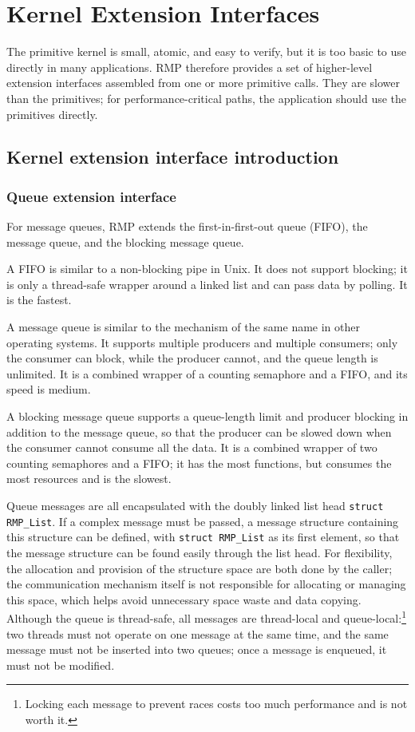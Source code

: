 \chapter{Kernel Extension Interfaces}\label{ch:extensions}

The primitive kernel is small, atomic, and easy to verify, but it is too basic to use directly in many applications.
RMP therefore provides a set of higher-level extension interfaces assembled from one or more primitive calls.
They are slower than the primitives; for performance-critical paths, the application should use the primitives directly.

\section{Kernel extension interface introduction}

\subsection{Queue extension interface}

For message queues, RMP extends the first-in-first-out queue (FIFO), the message queue, and the blocking message queue.

A FIFO is similar to a non-blocking pipe in Unix.
It does not support blocking; it is only a thread-safe wrapper around a linked list and can pass data by polling.
It is the fastest.

A message queue is similar to the mechanism of the same name in other operating systems.
It supports multiple producers and multiple consumers; only the consumer can block, while the producer cannot, and the queue length is unlimited.
It is a combined wrapper of a counting semaphore and a FIFO, and its speed is medium.

A blocking message queue supports a queue-length limit and producer blocking in addition to the message queue, so that the producer can be slowed down when the consumer cannot consume all the data.
It is a combined wrapper of two counting semaphores and a FIFO; it has the most functions, but consumes the most resources and is the slowest.

Queue messages are all encapsulated with the doubly linked list head \texttt{struct RMP\_List}.
If a complex message must be passed, a message structure containing this structure can be defined, with \texttt{struct RMP\_List} as its first element, so that the message structure can be found easily through the list head.
For flexibility, the allocation and provision of the structure space are both done by the caller; the communication mechanism itself is not responsible for allocating or managing this space, which helps avoid unnecessary space waste and data copying.
Although the queue is thread-safe, all messages are thread-local and queue-local:\footnote{Locking each message to prevent races costs too much performance and is not worth it.} two threads must not operate on one message at the same time, and the same message must not be inserted into two queues; once a message is enqueued, it must not be modified.

